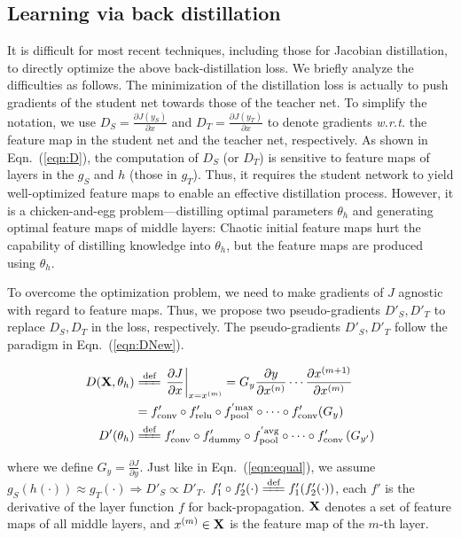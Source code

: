 \documentclass[10pt,twocolumn,letterpaper]{article}
\begin{document}
\subsection{Learning via back distillation}
\label{sec:backDistill}

It is difficult for most recent techniques, including those for Jacobian distillation\textcolor{red}{\footnotemark[1]}, to directly optimize the above back-distillation loss. We briefly analyze the difficulties as follows. The minimization of the distillation loss is actually to push gradients of the student net towards those of the teacher net. To simplify the notation, we use {\small$D_{S}=\frac{\partial J(y_{S})}{\partial x}$} and {\small$D_{T}=\frac{\partial J(y_{T})}{\partial x}$} to denote gradients \emph{w.r.t.} the feature map in the student net and the teacher net, respectively. As shown in Eqn.~(\ref{eqn:D}), the computation of {\small$D_{S}$} (or {\small$D_{T}$}) is sensitive to feature maps of layers in the {\small$g_{S}$ and $h$} (those in {\small$g_{T}$}). Thus, it requires the student network to yield well-optimized feature maps to enable an effective distillation process. However, it is a chicken-and-egg problem---distilling optimal parameters {\small$\theta_{h}$} and generating optimal feature maps of middle layers: Chaotic initial feature maps hurt the capability of distilling knowledge into {\small$\theta_{h}$}, but the feature maps are produced using {\small$\theta_{h}$}.

To overcome the optimization problem, we need to make gradients of $J$ agnostic with regard to feature maps. Thus, we propose two pseudo-gradients {\small$D'_{S},D'_{T}$} to replace {\small$D_{S},D_{T}$} in the loss, respectively. The pseudo-gradients {\small$D'_{S},D'_{T}$} follow the paradigm in Eqn.~(\ref{eqn:DNew}).
\begin{small}
\begin{subequations}
\begin{align}
D({\bf X},\theta_{h})&\xlongequal[]{\textrm{def}}\left.\frac{\partial J}{\partial x}\right|_{x=x^{(m)}}=G_{y}\frac{\partial y}{\partial x^{(n)}}\cdots\frac{\partial x^{(m+1)}}{\partial x^{(m)}}\label{eqn:D}\\
&=f'_{\textrm{conv}}\circ f'_{\textrm{relu}}\circ f_{\textrm{pool}}^{'\textrm{max}}\circ\cdots\circ f'_{\textrm{conv}}(G_{y})\nonumber\\
D'(\theta_{h})&\xlongequal[]{\textrm{def}}f'_{\textrm{conv}}\circ f'_{\textrm{dummy}}\circ f_{\textrm{pool}}^{'\textrm{avg}}\circ\cdots\circ f'_{\textrm{conv}}\left(G_{y'}\right)\label{eqn:DNew}
\end{align}
\end{subequations}
\end{small}
where we define {\small$G_{y}=\frac{\partial J}{\partial y}$}. Just like in Eqn.~(\ref{eqn:equal}), we assume {\small$g_{S}(h(\cdot))\approx g_{T}(\cdot)\Rightarrow D'_{S}\propto D'_{T}$}. {\small$f'_1\circ f'_2(\cdot)\xlongequal[]{\textrm{def}}f'_1(f'_2(\cdot))$}, each $f'$ is the derivative of the layer function $f$ for back-propagation. {\small${\bf X}$} denotes a set of feature maps of all middle layers, and {\small$x^{(m)}\in{\bf X}$} is the feature map of the $m$-th layer.
\end{document}
